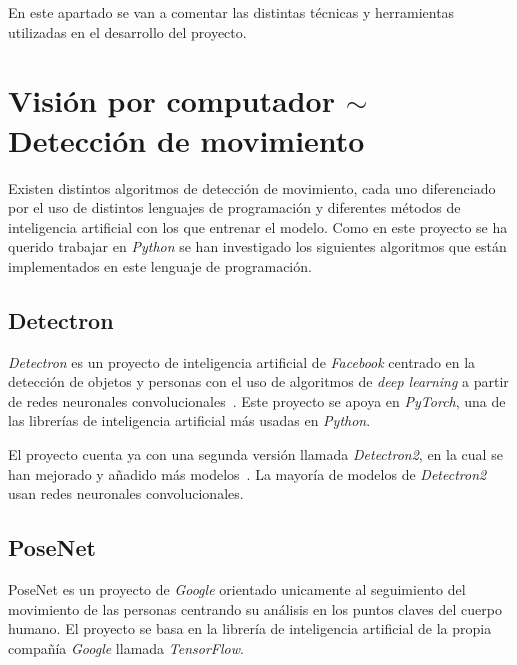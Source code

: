 
En este apartado se van a comentar las distintas técnicas y herramientas utilizadas en el desarrollo del proyecto.

\section{Visión por computador $\sim$ Detección de movimiento}
Existen distintos algoritmos de detección de movimiento, cada uno diferenciado por el uso de distintos lenguajes de programación y diferentes métodos de inteligencia artificial con los que entrenar el modelo. Como en este proyecto se ha querido trabajar en \textit{Python} se han investigado los siguientes algoritmos que están implementados en este lenguaje de programación. 

\subsection{Detectron}\label{dectectron}
\textit{Detectron} es un proyecto de inteligencia artificial de \textit{Facebook} centrado en la detección de objetos y personas con el uso de algoritmos de \textit{deep learning} a partir de redes neuronales convolucionales~\cite{Detectron2018}. Este proyecto se apoya en \textit{PyTorch}, una de las librerías de inteligencia artificial más usadas en \textit{Python}.

El proyecto cuenta ya con una segunda versión llamada \textit{Detectron2}, en la cual se han mejorado y añadido más modelos~\cite{wu2019detectron2}. La mayoría de modelos de \textit{Detectron2} usan redes neuronales convolucionales.


\subsection{PoseNet}
PoseNet es un proyecto de \textit{Google} orientado unicamente al seguimiento del movimiento de las personas centrando su análisis en los puntos claves del cuerpo humano. El proyecto se basa en la librería de inteligencia artificial de la propia compañía \textit{Google} llamada \textit{TensorFlow}.


